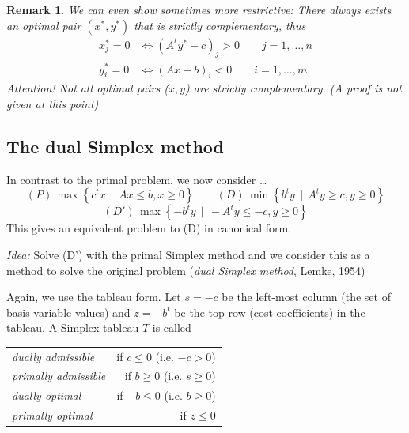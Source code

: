 \documentclass[a4paper]{article}
\numberwithin{lecref}{section}
\newtheorem*{Remark}{Remark}
\newcommand{\SetDef}[2]{\left\{#1\,\mid\,#2\right\}}
\begin{document}
\begin{Remark}
	We can even show sometimes more restrictive:
	There always exists an optimal pair $(x^*, y^*)$ that is strictly complementary, thus
	\begin{align*}
		x^*_j = 0 &\iff (A^t y^* - c)_j > 0 \qquad j = 1, \dots, n \\
		y^*_i = 0 &\iff (Ax - b)_i < 0 \qquad i = 1, \dots, m
	\end{align*}
	\emph{Attention!} Not all optimal pairs ($x, y$) are strictly complementary. (A proof is not given at this point)
\end{Remark}

\subsection{The dual Simplex method}
\label{section:4.4}

In contrast to the primal problem, we now consider \dots
\[ (P) \, \max\SetDef{c^t x}{Ax \leq b, x \geq 0} \qquad (D) \, \min\SetDef{b^t y}{A^t y \geq c, y \geq 0} \]
\[ (D') \, \max\SetDef{-b^t y}{-A^t y \leq -c, y \geq 0} \]
This gives an equivalent problem to (D) in canonical form.

\emph{Idea:} Solve (D') with the primal Simplex method and we consider this as a method to solve the original problem (\emph{dual Simplex method}, Lemke, 1954)

Again, we use the tableau form.
Let $s = -c$ be the left-most column (the set of basis variable values) and $z = -b^t$ be the top row (cost coefficients) in the tableau.
A Simplex tableau $T$ is called
\begin{tabular}{lr}
  \emph{dually admissible}\index{Dually admissible Simplex tableau} & if $c \leq 0$ (i.e. $-c > 0$) \\
  \emph{primally admissible}\index{Primally admissible Simplex tableau} & if $b \geq 0$ (i.e. $s \geq 0$) \\
  \emph{dually optimal}\index{Dually optimal Simplex tableau} & if $-b \leq 0$ (i.e. $b \geq 0$) \\
  \emph{primally optimal}\index{Primally optimal Simplex tableau} & if $z \leq 0$
\end{tabular}
\end{document}
